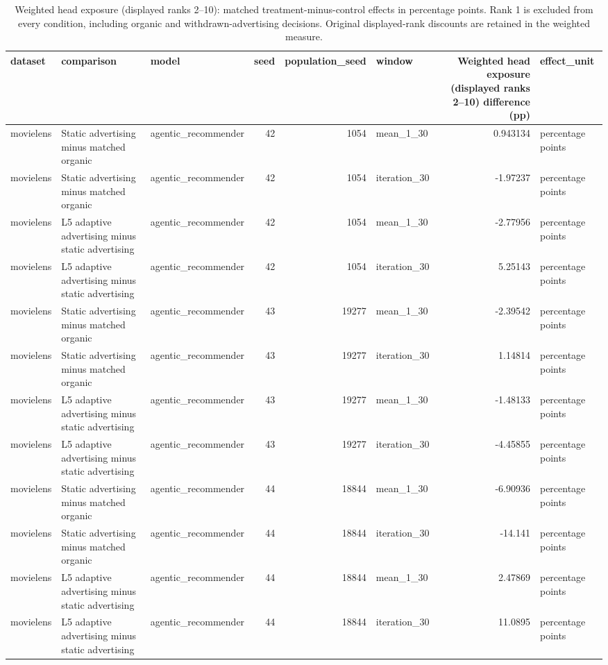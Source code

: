 \begin{table}[htbp!]
\centering
\small
\setlength{\tabcolsep}{3pt}
\renewcommand{\arraystretch}{1.1}
\begin{tabular}{lllrrlrl}
\hline
dataset & comparison & model & seed & population\_seed & window & Weighted head exposure (displayed ranks 2–10) difference (pp) & effect\_unit \\
\hline
movielens & Static advertising minus matched organic & agentic\_recommender & 42 & 1054 & mean\_1\_30 & 0.943134 & percentage points \\
movielens & Static advertising minus matched organic & agentic\_recommender & 42 & 1054 & iteration\_30 & -1.97237 & percentage points \\
movielens & L5 adaptive advertising minus static advertising & agentic\_recommender & 42 & 1054 & mean\_1\_30 & -2.77956 & percentage points \\
movielens & L5 adaptive advertising minus static advertising & agentic\_recommender & 42 & 1054 & iteration\_30 & 5.25143 & percentage points \\
movielens & Static advertising minus matched organic & agentic\_recommender & 43 & 19277 & mean\_1\_30 & -2.39542 & percentage points \\
movielens & Static advertising minus matched organic & agentic\_recommender & 43 & 19277 & iteration\_30 & 1.14814 & percentage points \\
movielens & L5 adaptive advertising minus static advertising & agentic\_recommender & 43 & 19277 & mean\_1\_30 & -1.48133 & percentage points \\
movielens & L5 adaptive advertising minus static advertising & agentic\_recommender & 43 & 19277 & iteration\_30 & -4.45855 & percentage points \\
movielens & Static advertising minus matched organic & agentic\_recommender & 44 & 18844 & mean\_1\_30 & -6.90936 & percentage points \\
movielens & Static advertising minus matched organic & agentic\_recommender & 44 & 18844 & iteration\_30 & -14.141 & percentage points \\
movielens & L5 adaptive advertising minus static advertising & agentic\_recommender & 44 & 18844 & mean\_1\_30 & 2.47869 & percentage points \\
movielens & L5 adaptive advertising minus static advertising & agentic\_recommender & 44 & 18844 & iteration\_30 & 11.0895 & percentage points \\
\hline
\end{tabular}
\caption{Weighted head exposure (displayed ranks 2–10): matched treatment-minus-control effects in percentage points. Rank 1 is excluded from every condition, including organic and withdrawn-advertising decisions. Original displayed-rank discounts are retained in the weighted measure.}
\label{chap:results:tab:rq1_advertising_weighted_head_exposure_ranks_2_10_effects}
\end{table}
